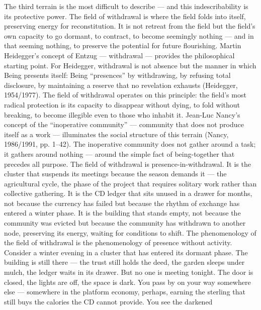 The third terrain is the most difficult to describe — and this indescribability is its protective power. The field of withdrawal is where the field folds into itself, preserving energy for reconstitution. It is not retreat from the field but the field’s own capacity to go dormant, to contract, to become seemingly nothing — and in that seeming nothing, to preserve the potential for future flourishing. Martin Heidegger’s concept of Entzug — withdrawal — provides the philosophical starting point. For Heidegger, withdrawal is not absence but the manner in which Being presents itself: Being “presences” by withdrawing, by refusing total disclosure, by maintaining a reserve that no revelation exhausts (Heidegger, 1954/1977). The field of withdrawal operates on this principle: the field’s most radical protection is its capacity to disappear without dying, to fold without breaking, to become illegible even to those who inhabit it. Jean-Luc Nancy’s concept of the “inoperative community” — community that does not produce itself as a work — illuminates the social structure of this terrain (Nancy, 1986/1991, pp. 1–42). The inoperative community does not gather around a task; it gathers around nothing — around the simple fact of being-together that precedes all purpose. The field of withdrawal is presence-in-withdrawal. It is the cluster that suspends its meetings because the season demands it — the agricultural cycle, the phase of the project that requires solitary work rather than collective gathering. It is the CD ledger that sits unused in a drawer for months, not because the currency has failed but because the rhythm of exchange has entered a winter phase. It is the building that stands empty, not because the community was evicted but because the community has withdrawn to another node, preserving its energy, waiting for conditions to shift. The phenomenology of the field of withdrawal is the phenomenology of presence without activity. Consider a winter evening in a cluster that has entered its dormant phase. The building is still there — the trust still holds the deed, the garden sleeps under mulch, the ledger waits in its drawer. But no one is meeting tonight. The door is closed, the lights are off, the space is dark. You pass by on your way somewhere else — somewhere in the platform economy, perhaps, earning the sterling that still buys the calories the CD cannot provide. You see the darkened

